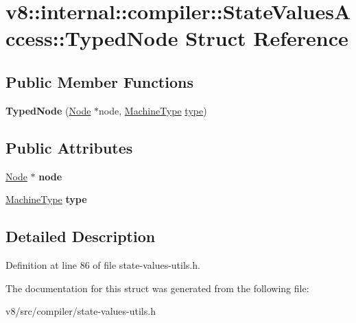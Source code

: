 \hypertarget{structv8_1_1internal_1_1compiler_1_1StateValuesAccess_1_1TypedNode}{}\section{v8\+:\+:internal\+:\+:compiler\+:\+:State\+Values\+Access\+:\+:Typed\+Node Struct Reference}
\label{structv8_1_1internal_1_1compiler_1_1StateValuesAccess_1_1TypedNode}
\subsection*{Public Member Functions}
\begin{DoxyCompactItemize}
\item 
\mbox{\label{structv8_1_1internal_1_1compiler_1_1StateValuesAccess_1_1TypedNode_a4a6a66a7c3644db0f7cb2a45271911b1}} 
{\bfseries Typed\+Node} (\mbox{\hyperlink{classv8_1_1internal_1_1compiler_1_1Node}{Node}} $\ast$node, \mbox{\hyperlink{classv8_1_1internal_1_1MachineType}{Machine\+Type}} \mbox{\hyperlink{classstd_1_1conditional_1_1type}{type}})
\end{DoxyCompactItemize}
\subsection*{Public Attributes}
\begin{DoxyCompactItemize}
\item 
\mbox{\label{structv8_1_1internal_1_1compiler_1_1StateValuesAccess_1_1TypedNode_a467721b9e4b7687c84e05d086fdd606e}} 
\mbox{\hyperlink{classv8_1_1internal_1_1compiler_1_1Node}{Node}} $\ast$ {\bfseries node}
\item 
\mbox{\label{structv8_1_1internal_1_1compiler_1_1StateValuesAccess_1_1TypedNode_a5666d30f4ebc578f55d7e787736c8ba4}} 
\mbox{\hyperlink{classv8_1_1internal_1_1MachineType}{Machine\+Type}} {\bfseries type}
\end{DoxyCompactItemize}


\subsection{Detailed Description}


Definition at line 86 of file state-\/values-\/utils.\+h.



The documentation for this struct was generated from the following file\+:\begin{DoxyCompactItemize}
\item 
v8/src/compiler/state-\/values-\/utils.\+h\end{DoxyCompactItemize}
